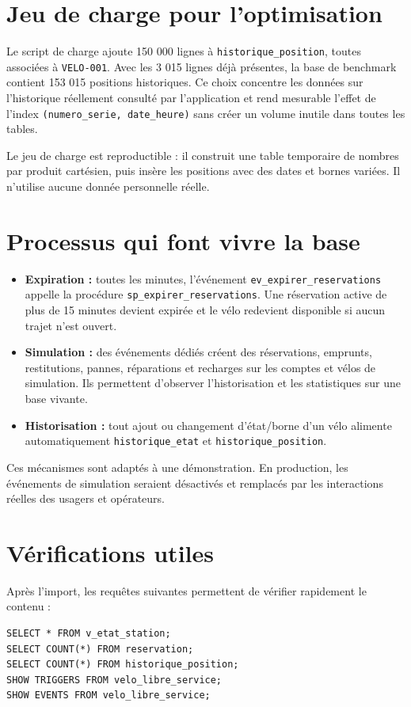 \documentclass[11pt,a4paper]{article}
\begin{document}
\section{Jeu de charge pour l'optimisation}
Le script de charge ajoute 150 000 lignes à \texttt{historique\_position}, toutes associées à \texttt{VELO-001}. Avec les 3 015 lignes déjà présentes, la base de benchmark contient 153 015 positions historiques. Ce choix concentre les données sur l'historique réellement consulté par l'application et rend mesurable l'effet de l'index \texttt{(numero\_serie, date\_heure)} sans créer un volume inutile dans toutes les tables.

Le jeu de charge est reproductible : il construit une table temporaire de nombres par produit cartésien, puis insère les positions avec des dates et bornes variées. Il n'utilise aucune donnée personnelle réelle.

\section{Processus qui font vivre la base}
\begin{itemize}
  \item \textbf{Expiration :} toutes les minutes, l'événement \texttt{ev\_expirer\_reservations} appelle la procédure \texttt{sp\_expirer\_reservations}. Une réservation active de plus de 15 minutes devient expirée et le vélo redevient disponible si aucun trajet n'est ouvert.
  \item \textbf{Simulation :} des événements dédiés créent des réservations, emprunts, restitutions, pannes, réparations et recharges sur les comptes et vélos de simulation. Ils permettent d'observer l'historisation et les statistiques sur une base vivante.
  \item \textbf{Historisation :} tout ajout ou changement d'état/borne d'un vélo alimente automatiquement \texttt{historique\_etat} et \texttt{historique\_position}.
\end{itemize}

Ces mécanismes sont adaptés à une démonstration. En production, les événements de simulation seraient désactivés et remplacés par les interactions réelles des usagers et opérateurs.

\section{Vérifications utiles}
Après l'import, les requêtes suivantes permettent de vérifier rapidement le contenu :
\begin{verbatim}
SELECT * FROM v_etat_station;
SELECT COUNT(*) FROM reservation;
SELECT COUNT(*) FROM historique_position;
SHOW TRIGGERS FROM velo_libre_service;
SHOW EVENTS FROM velo_libre_service;
\end{verbatim}
\end{document}
